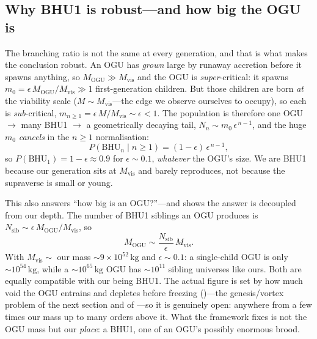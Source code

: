 \subsection{Why BHU1 is robust---and how big the OGU is}
\label{sec:ogu-size}

The branching ratio is not the same at every generation, and that is what makes
the conclusion robust. An OGU has \emph{grown} large by runaway accretion before it
spawns anything, so $M_{\mathrm{OGU}}\gg M_{\mathrm{vis}}$ and the OGU is
\emph{super}-critical: it spawns $m_0=\epsilon\,M_{\mathrm{OGU}}/M_{\mathrm{vis}}
\gg1$ first-generation children. But those children are born \emph{at} the
viability scale ($M\sim M_{\mathrm{vis}}$---the edge we observe ourselves to
occupy), so each is \emph{sub}-critical, $m_{n\ge1}=\epsilon\,M/M_{\mathrm{vis}}
\sim\epsilon<1$. The population is therefore one OGU $\to$ many BHU1 $\to$ a
geometrically decaying tail, $N_n\sim m_0\,\epsilon^{\,n-1}$, and the huge $m_0$
\emph{cancels} in the $n\ge1$ normalisation:
\begin{equation}
  P(\mathrm{BHU}_n\mid n\ge1) = (1-\epsilon)\,\epsilon^{\,n-1},
  \label{eq:gen-depth}
\end{equation}
so $P(\mathrm{BHU}_1)=1-\epsilon\approx0.9$ for $\epsilon\sim0.1$, \emph{whatever}
the OGU's size. We are BHU1 because our generation sits at $M_{\mathrm{vis}}$ and
barely reproduces, not because the supraverse is small or young.

This also answers ``how big is an OGU?''---and shows the answer is decoupled from
our depth. The number of BHU1 siblings an OGU produces is
$N_{\mathrm{sib}}\sim\epsilon\,M_{\mathrm{OGU}}/M_{\mathrm{vis}}$, so
\begin{equation}
  M_{\mathrm{OGU}}\sim \frac{N_{\mathrm{sib}}}{\epsilon}\,M_{\mathrm{vis}}.
\end{equation}
With $M_{\mathrm{vis}}\sim$ our mass $\sim9\times10^{52}\,\mathrm{kg}$ and
$\epsilon\sim0.1$: a single-child OGU is only $\sim10^{54}\,\mathrm{kg}$, while a
$\sim10^{65}\,\mathrm{kg}$ OGU has $\sim10^{11}$ sibling universes like ours. Both
are equally compatible with our being BHU1. The actual figure is set by how much
void the OGU entrains and depletes before freezing
()---the genesis/vortex problem of the next section and
of ---so it is genuinely open: anywhere from a few times our mass
up to many orders above it. What the framework fixes is not the OGU mass but our
\emph{place}: a BHU1, one of an OGU's possibly enormous brood.

